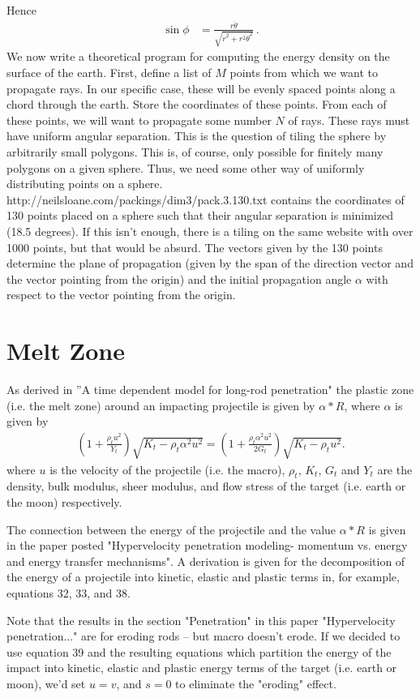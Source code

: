 \documentclass{article}
\newcommand*\f[2]{\frac{#1}{#2}}
\begin{document}
Hence
\begin{align}
\sin\phi&=\f{r\dot\theta}{\sqrt{\dot r^2+r^2\dot\theta^2}}\,.
\end{align}
We now write a theoretical program for computing the energy density on the surface of the earth. First, define a list of $M$ points from which we want to propagate rays. In our specific case, these will be evenly spaced points along a chord through the earth. Store the coordinates of these points. From each of these points, we will want to propagate some number $N$ of rays. These rays must have uniform angular separation. This is the question of tiling the sphere by arbitrarily small polygons. This is, of course, only possible for finitely many polygons on a given sphere. Thus, we need some other way of uniformly distributing points on a sphere. {http://neilsloane.com/packings/dim3/pack.3.130.txt} contains the coordinates of 130 points placed on a sphere such that their angular separation is minimized (18.5 degrees). If this isn't enough, there is a tiling on the same website with over 1000 points, but that would be absurd. The vectors given by the 130 points determine the plane of propagation (given by the span of the direction vector and the vector pointing from the origin) and the initial propagation angle $\alpha$ with respect to the vector pointing from the origin.

\pagebreak
\section{Melt Zone}
As derived in ''A time dependent model for long-rod penetration" the plastic zone (i.e. the melt zone) around an impacting projectile is given by $\alpha*R$, where $\alpha$ is given by 
\begin{align}
(1+\frac{\rho_t u^2}{Y_t})\sqrt{K_t - \rho_t \alpha^2 u^2} = (1+\frac{\rho_t \alpha^2 u^2}{2G_t})\sqrt{K_t - \rho_t u^2}.
\end{align}
where $u$ is the velocity of the projectile (i.e. the macro), $\rho_t$, $K_t$, $G_t$ and $Y_t$ are the density, bulk modulus, sheer modulus, and flow stress of the target (i.e. earth or the moon) respectively.

The connection between the energy of the projectile and the value $\alpha*R$ is given in the paper posted "Hypervelocity penetration modeling- momentum vs. energy and energy transfer mechanisms". A derivation is given for the decomposition of the energy of a projectile into kinetic, elastic and plastic terms in, for example, equations 32, 33, and 38.

Note that the results in the section "Penetration" in this paper "Hypervelocity penetration..." are for eroding rods -- but macro doesn't erode.  If we decided to use equation 39 and the resulting equations which partition the energy of the impact into kinetic, elastic and plastic energy terms of the target (i.e. earth or moon), we'd set $u = v$, and $s = 0$ to eliminate the "eroding" effect.
\end{document}
